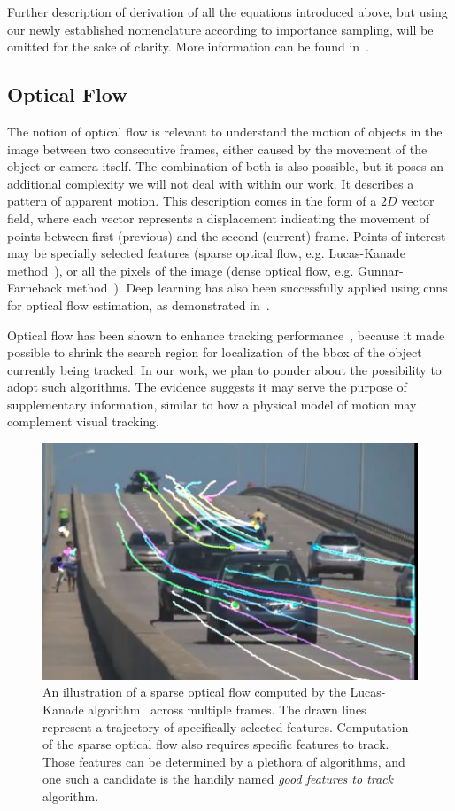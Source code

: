 Further description of derivation of all the equations introduced above, but using our newly established nomenclature according to importance sampling, will be omitted for the sake of clarity. More information can be found in~\cite{Arulampalam2007}.

\subsection{Optical Flow}
\label{ssec:OpticalFlow}

The notion of optical flow is relevant to understand the motion of objects in the image between two consecutive frames, either caused by the movement of the object or camera itself. The combination of both is also possible, but it poses an additional complexity we will not deal with within our work. It describes a pattern of apparent motion. This description comes in the form of a $2D$ vector field, where each vector represents a displacement indicating the movement of points between first (previous) and the second (current) frame. Points of interest may be specially selected features (sparse optical flow, e.g. Lucas-Kanade method~\cite{Lucas1981}), or all the pixels of the image (dense optical flow, e.g. Gunnar-Farneback method~\cite{GunnarFarneback}). Deep learning has also been successfully applied using \glspl{cnn} for optical flow estimation, as demonstrated in~\cite{Dosovitskiy2015}.

Optical flow has been shown to enhance tracking performance~\cite{Leal-Taixe2016}, because it made possible to shrink the search region for localization of the \gls{bbox} of the object currently being tracked. In our work, we plan to ponder about the possibility to adopt such algorithms. The evidence suggests it may serve the purpose of supplementary information, similar to how a physical model of motion may complement visual tracking.

\begin{figure}[t]
    \centerline{\includegraphics[width=0.5\linewidth]{figures/theoretical_foundations/opticalflow_lk.jpg}}
    \caption[Sparse optical flow]{An illustration of a sparse optical flow computed by the Lucas-Kanade algorithm~\cite{Lucas1981} across multiple frames. The drawn lines represent a trajectory of specifically selected features. Computation of the sparse optical flow also requires specific features to track. Those features can be determined by a plethora of algorithms, and one such a candidate is the handily named \emph{good features to track}~\cite{Shi1994} algorithm. }
    \label{fig:OpticalFlowLucasKanade}
\end{figure}

